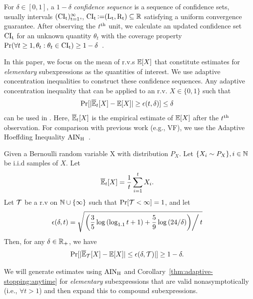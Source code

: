 \begin{definition}
For $\delta \in [0, 1]$, a $1-\delta$ \textit{confidence sequence} is a sequence of confidence sets, usually intervals  $(\rm{CI}_t)_{t=1}^\infty,$, $\rm{CI}_t \operatorname{\vcentcolon=} (L_t, R_t) \subseteq {\mathbb{R}}$
satisfying a uniform convergence guarantee.
After observing the $t^{\rm{th}}$ unit, we calculate an updated confidence set $\rm{CI}_t$ for an unknown quantity $\theta_t$ with the coverage property $\Pr(\forall t \geq 1, \theta_t: \theta_t \in \rm{CI}_t) \geq 1 - \delta$~\citep{howard2021time}.
\end{definition}
\noindent In this paper, we focus on the mean of r.v.s $\mathbb{E}[X]$ that constitute estimates for \textit{elementary} subexpressions as the quantities of interest. 
We use adaptive concentration inequalities to construct these confidence sequences.
Any adaptive concentration inequality that can be applied to an r.v. $X \in \{0, 1\}$ such that 
\begin{equation}
    \Pr[|\overline{\mathbb{E}}_t[X] - \mathbb{E}[X]| \geq \epsilon(t, \delta)] \leq \delta
    \label{eq:adaptive-conc:general}
\end{equation}
can be used in \AVOIRmethodname{}. 
Here, $\overline{\mathbb{E}}_t[X]$ is the empirical estimate of $\mathbb{E}[X]$ after the $t^{\rm{th}}$ observation.
For comparison with previous work (e.g., VF), we use the Adaptive Hoeffding Inequality $\rm{AIN}_H$~\citep{zhao2016adaptive}.
\begin{theorem}[AIN$_H$]
\label{thm:adaptive-stopping}
Given a Bernoulli random variable X with distribution $P_X$. Let $\{X_i \sim P_X\}, i \in \mathbb{N}$ be i.i.d samples of $X$. Let 
\[
\overline{\mathbb{E}}_t[X] = \frac{1}{t}\sum\limits_{i=1}^{t}X_i.
\]
Let ${\mathcal{T}}$ be a r.v  on $\mathbb{N} \cup \{\infty\}$ such that $\Pr[{\mathcal{T}} < \infty] = 1$, and let
\[
    \epsilon(\delta, t) = \sqrt{ \left. \left( \frac{3}{5}\log{(\log_{1.1}{t} + 1)} + \frac{5}{9}\log{(24/\delta)}\right)\right/t}
\]
Then, for any $\delta \in \mathbb{R}_+$, we have
\[
  \Pr[|\overline{\mathbb{E}}_{\mathcal{T}}[X] - \mathbb{E}[X]| \leq \epsilon(\delta, {\mathcal{T}})|] \geq 1 - \delta. 
\]
\end{theorem}
We will generate estimates using $\rm{AIN}_H$ and Corollary~\ref{thm:adaptive-stopping:anytime} for \textit{elementary} subexpressions that are valid nonasymptotically (i.e., $\forall t > 1$) and then expand this to compound subexpressions.

